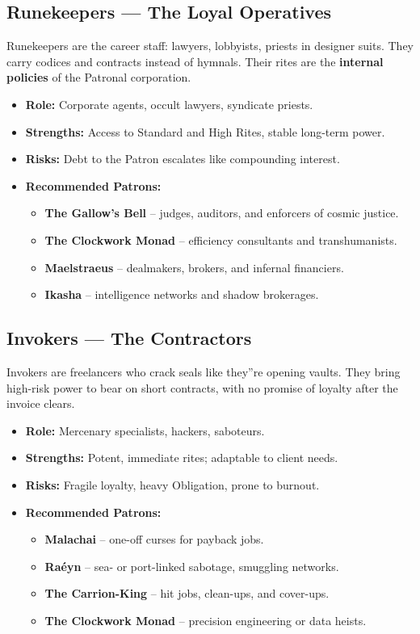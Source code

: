 \documentclass[11pt]{article}
\begin{document}
\subsection*{Runekeepers --- The Loyal Operatives}
Runekeepers are the career staff: lawyers, lobbyists, priests in designer suits. They carry codices and contracts instead of hymnals. Their rites are the \textbf{internal policies} of the Patronal corporation.
\begin{itemize}
  \item \textbf{Role:} Corporate agents, occult lawyers, syndicate priests.
  \item \textbf{Strengths:} Access to Standard and High Rites, stable long-term power.
  \item \textbf{Risks:} Debt to the Patron escalates like compounding interest.
  \item \textbf{Recommended Patrons:}
    \begin{itemize}
      \item \textbf{The Gallow's Bell} -- judges, auditors, and enforcers of cosmic justice.
      \item \textbf{The Clockwork Monad} -- efficiency consultants and transhumanists.
      \item \textbf{Maelstraeus} -- dealmakers, brokers, and infernal financiers.
      \item \textbf{Ikasha} -- intelligence networks and shadow brokerages.
    \end{itemize}
\end{itemize}

\subsection*{Invokers --- The Contractors}
Invokers are freelancers who crack seals like they''re opening vaults. They bring high-risk power to bear on short contracts, with no promise of loyalty after the invoice clears.
\begin{itemize}
  \item \textbf{Role:} Mercenary specialists, hackers, saboteurs.
  \item \textbf{Strengths:} Potent, immediate rites; adaptable to client needs.
  \item \textbf{Risks:} Fragile loyalty, heavy Obligation, prone to burnout.
  \item \textbf{Recommended Patrons:}
    \begin{itemize}
      \item \textbf{Malachai} -- one-off curses for payback jobs.
      \item \textbf{Raéyn} -- sea- or port-linked sabotage, smuggling networks.
      \item \textbf{The Carrion-King} -- hit jobs, clean-ups, and cover-ups.
      \item \textbf{The Clockwork Monad} -- precision engineering or data heists.
    \end{itemize}
\end{itemize}
\end{document}
